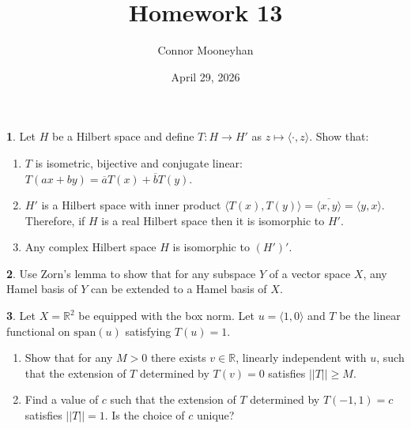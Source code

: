 \documentclass[12pt]{article}
\title{Homework 13}
\author{Connor Mooneyhan}
\date{April 29, 2026}
\theoremstyle{definition}
\newtheorem{ex}{}
\begin{document}
\maketitle

\begin{ex}
  Let $H$ be a Hilbert space and define $T: H \to H'$ as $z \mapsto \langle \cdot, z \rangle$.
  Show that: \begin{enumerate}[label=(\arabic*)]
    \item $T$ is isometric, bijective and conjugate linear: $T(ax + by) = \overline{a}T(x) + \overline{b}T(y)$.
    \item $H'$ is a Hilbert space with inner product $\langle T(x), T(y) \rangle = \overline{\langle x, y \rangle} = \langle y, x \rangle$.
      Therefore, if $H$ is a real Hilbert space then it is isomorphic to $H'$.
    \item Any complex Hilbert space $H$ is isomorphic to $(H')'$.
  \end{enumerate}
\end{ex}

\begin{ex}
  Use Zorn's lemma to show that for any subspace $Y$ of a vector space $X$, any Hamel basis of $Y$ can be extended to a Hamel basis of $X$.
\end{ex}

\begin{ex}
  Let $X = \mathbb{R}^2$ be equipped with the box norm.
  Let $u = \langle 1, 0 \rangle$ and $T$ be the linear functional on $\mathrm{span}(u)$ satisfying $T(u) = 1$. \begin{enumerate}[label=(\arabic*)]
    \item Show that for any $M > 0$ there exists $v \in \mathbb{R}$, linearly independent with $u$, such that the extension of $T$ determined by $T(v) = 0$ satisfies $||T|| \geq M$.
    \item Find a value of $c$ such that the extension of $T$ determined by $T(-1, 1) = c$ satisfies $||T|| = 1$.
      Is the choice of $c$ unique?
  \end{enumerate}
\end{ex}
\end{document}
